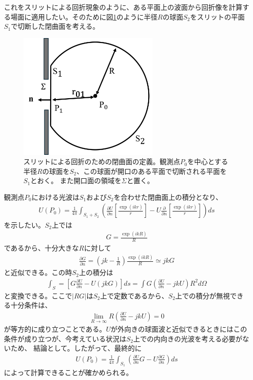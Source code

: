\documentclass[a4paper,11pt,uplatex]{jsbook}
\begin{document}
これをスリットによる回折現象のように、ある平面上の波面から回折像を計算する場面に適用したい。そのために図\ref{fig:diff_kir}のように半径$R$の球面$S_2$をスリットの平面$S_1$で切断した閉曲面を考える。
\begin{figure}[h]
  \centering
  \includegraphics[width=7cm]{image/2-diffraction_kir.png}
  \caption[スリットによる回折の模式図]{スリットによる回折のための閉曲面の定義。観測点$P_0$を中心とする半径$R$の球面を$S_2$、この球面が開口のある平面で切断される平面を$S_1$とおく。
  また開口面の領域を$\Sigma$と置く。}\label{fig:diff_kir}
\end{figure}
観測点$P_0$における光波は$S_1$および$S_2$を合わせた閉曲面上の積分となり、
\begin{eqnarray}
  U(P_0) = \frac{1}{4\pi}\int_{S_1+S_2} \left( \frac{\partial U}{\partial n} \left[ \frac{\exp(ikr)}{r} \right] - U\frac{\partial}{\partial n} \left[ \frac{\exp(ikr)}{r}\right] \right) ds
\end{eqnarray}
を示したい。$S_2$上では
\begin{eqnarray}
  G = \frac{\exp(ikR)}{R} 
\end{eqnarray}
であるから、十分大きな$R$に対して
\begin{eqnarray}
  \frac{\partial G}{\partial n} = \left( jk-\frac{1}{R}\right)\frac{\exp(ikR)}{R} \simeq jkG
\end{eqnarray}
と近似できる。この時$S_2$上の積分は
\begin{eqnarray}
  \int_S  = \left[ G\frac{\partial U}{\partial n} - U (jkG)\right]ds = \int G(\frac{\partial U}{\partial n} -jkU)R^2d\Omega
\end{eqnarray}
と変換できる。ここで$|RG|$は$S_2$上で定数であるから、$S_2$上での積分が無視できる十分条件は、
\begin{eqnarray}
  \lim_{R\rightarrow \infty} R\left(\frac{\partial U}{\partial n} -jkU \right) = 0
\end{eqnarray}
が等方的に成り立つことである。$U$が外向きの球面波と近似できるときにはこの条件が成り立つが、今考えている状況は$S_2$上での内向きの光波を考える必要がないため、
結論として。したがって、最終的に
\begin{eqnarray}
  U(P_0) = \frac{1}{4\pi}\int_{S_1} \left( \frac{\partial U}{\partial n} G - U\frac{\partial G}{\partial n}  \right) ds
\end{eqnarray}
によって計算できることが確かめられる。
\end{document}
